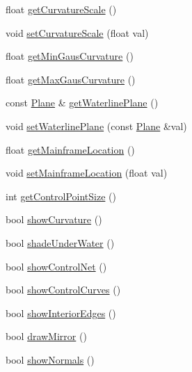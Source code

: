 \begin{DoxyCompactItemize}
\item 
float \hyperlink{classShipCAD_1_1SubdivisionSurface_a8dfd63bd3bd8ddf35491b12003a8b7ce}{get\-Curvature\-Scale} ()
\item 
void \hyperlink{classShipCAD_1_1SubdivisionSurface_af0de3c1d862ddb2466effbcff0189845}{set\-Curvature\-Scale} (float val)
\item 
float \hyperlink{classShipCAD_1_1SubdivisionSurface_ae511889be6115d7461808eda144947a8}{get\-Min\-Gaus\-Curvature} ()
\item 
float \hyperlink{classShipCAD_1_1SubdivisionSurface_a5189aba41418c44faae76b39284917c2}{get\-Max\-Gaus\-Curvature} ()
\item 
const \hyperlink{classShipCAD_1_1Plane}{Plane} \& \hyperlink{classShipCAD_1_1SubdivisionSurface_a5f4515130c512327b01e6aea577d0876}{get\-Waterline\-Plane} ()
\item 
void \hyperlink{classShipCAD_1_1SubdivisionSurface_ae063d1a2be4e227aaefb8a3578d3f52f}{set\-Waterline\-Plane} (const \hyperlink{classShipCAD_1_1Plane}{Plane} \&val)
\item 
float \hyperlink{classShipCAD_1_1SubdivisionSurface_a8b33594cec15c0ec7aa03eb9d53327bb}{get\-Mainframe\-Location} ()
\item 
void \hyperlink{classShipCAD_1_1SubdivisionSurface_a81d5637d3b405da5975eb8e86d058bcd}{set\-Mainframe\-Location} (float val)
\item 
int \hyperlink{classShipCAD_1_1SubdivisionSurface_a521c5ea29e765a0cf7bc0ec0268b499c}{get\-Control\-Point\-Size} ()
\item 
bool \hyperlink{classShipCAD_1_1SubdivisionSurface_ac7c4656b21e0aaa01525be5b7be84024}{show\-Curvature} ()
\item 
bool \hyperlink{classShipCAD_1_1SubdivisionSurface_adfb570208c96bf8bc3426a43fda5fe9f}{shade\-Under\-Water} ()
\item 
bool \hyperlink{classShipCAD_1_1SubdivisionSurface_a1886c21030a3c5c85797603d2d00c906}{show\-Control\-Net} ()
\item 
bool \hyperlink{classShipCAD_1_1SubdivisionSurface_ac94824bf3a085f9785bc49e659077156}{show\-Control\-Curves} ()
\item 
bool \hyperlink{classShipCAD_1_1SubdivisionSurface_a84834b65650ff350e993c00dccabab46}{show\-Interior\-Edges} ()
\item 
bool \hyperlink{classShipCAD_1_1SubdivisionSurface_a94d284672cca1fb619ef5c064bcd175b}{draw\-Mirror} ()
\item 
bool \hyperlink{classShipCAD_1_1SubdivisionSurface_a57a2abe37fef2cee7ca6c15ae5173672}{show\-Normals} ()

\end{DoxyCompactItemize}
